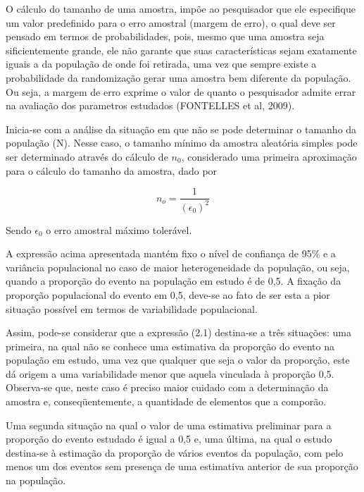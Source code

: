 \inic O cálculo do tamanho de uma amostra, impõe ao pesquisador
que ele especifique um valor predefinido para o erro amostral
(margem de erro), o qual deve ser pensado em termos de
probabilidades, pois, mesmo que uma amostra seja sificientemente
grande, ele não garante que suas características sejam exatamente
iguais a da população de onde foi retirada, uma vez que sempre
existe a probabilidade da randomização gerar uma amostra bem
diferente da população. Ou seja, a margem de erro exprime o valor
de quanto o pesquisador admite errar na avaliação dos parametros
estudados (FONTELLES et al, 2009).\vskip0.3cm

Inicia-se com a análise da situação em que não se pode determinar
o tamanho da população (N). Nesse caso, o tamanho mínimo da
amostra aleatória simples pode ser determinado através do cálculo
de $n_{0}$, considerado uma primeira aproximação para o cálculo do
tamanho da amostra, dado por


\begin{equation}\label{nzero}
    n_{o}=\frac{1}{\left(\epsilon_{0}\right)^2}
\end{equation}

Sendo $\epsilon_{0}$ o erro amostral máximo tolerável.\vskip0.3cm

A expressão acima apresentada mantém fixo o nível de confiança de 95\% e a variância populacional no caso de maior heterogeneidade da população, ou seja, quando a proporção do evento na população em estudo é de 0,5. A fixação da proporção populacional do evento em 0,5, deve-se ao fato de ser esta a pior situação possível em termos de variabilidade populacional. \vskip0.3cm

Assim, pode-se considerar que a expressão (2.1) destina-se a três
situações: uma primeira, na qual não se conhece uma estimativa da
proporção do evento na população em estudo, uma vez que qualquer
que seja o valor da proporção, este dá origem a uma variabilidade
menor que aquela vinculada à proporção 0,5. Observa-se que, neste
caso é preciso maior cuidado com a determinação da amostra e,
conseqüentemente, a quantidade de elementos que a
comporão.\vskip0.3cm

Uma segunda situação na qual o valor de uma estimativa preliminar para a proporção do evento estudado é igual a 0,5 e, uma última, na qual o estudo destina-se à estimação da proporção de vários eventos da população, com pelo menos um dos eventos sem presença de uma estimativa anterior de sua proporção na população.\vskip0.3cm



